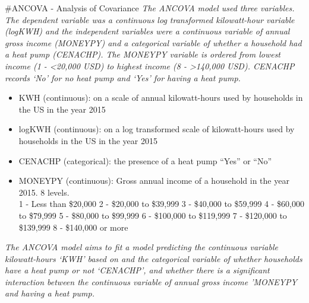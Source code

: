 \documentclass[
]{article}
\newenvironment{Shaded}{\begin{snugshade}}{\end{snugshade}}
\newcommand{\CommentTok}[1]{\textcolor[rgb]{0.56,0.35,0.01}{\textit{#1}}}
\newcommand{\FunctionTok}[1]{\textcolor[rgb]{0.00,0.00,0.00}{#1}}
\newcommand{\NormalTok}[1]{#1}
\newcommand{\OtherTok}[1]{\textcolor[rgb]{0.56,0.35,0.01}{#1}}
\newcommand{\SpecialCharTok}[1]{\textcolor[rgb]{0.00,0.00,0.00}{#1}}
\newcommand{\StringTok}[1]{\textcolor[rgb]{0.31,0.60,0.02}{#1}}
\providecommand{\tightlist}{%
  \setlength{\itemsep}{0pt}\setlength{\parskip}{0pt}}
\begin{document}
\#ANCOVA - Analysis of Covariance \emph{The ANCOVA model used three
variables. The dependent variable was a continuous log transformed
kilowatt-hour variable (logKWH) and the independent variables were a
continuous variable of annual gross income (MONEYPY) and a categorical
variable of whether a household had a heat pump (CENACHP). The MONEYPY
variable is ordered from lowest income (1 - \textless20,000 USD) to
highest income (8 - \textgreater140,000 USD). CENACHP records `No' for
no heat pump and `Yes' for having a heat pump.}

\begin{itemize}
\tightlist
\item
  KWH (continuous): on a scale of annual kilowatt-hours used by
  households in the US in the year 2015
\item
  logKWH (continuous): on a log transformed scale of kilowatt-hours used
  by households in the US in the year 2015
\item
  CENACHP (categorical): the presence of a heat pump ``Yes'' or ``No''
\item
  MONEYPY (continuous): Gross annual income of a household in the year
  2015. 8 levels.\\
  1 - Less than \$20,000 2 - \$20,000 to \$39,999 3 - \$40,000 to
  \$59,999 4 - \$60,000 to \$79,999 5 - \$80,000 to \$99,999 6 -
  \$100,000 to \$119,999 7 - \$120,000 to \$139,999 8 - \$140,000 or
  more
\end{itemize}

\emph{The ANCOVA model aims to fit a model predicting the continuous
variable kilowatt-hours `KWH' based on and the categorical variable of
whether households have a heat pump or not `CENACHP', and whether there
is a significant interaction between the continuous variable of annual
gross income 'MONEYPY and having a heat pump.}

\begin{Shaded}
\end{Shaded}
\end{document}
